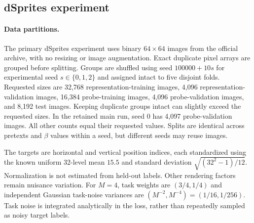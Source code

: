 \begin{table}[t]
  \centering
  
  \caption{\textbf{Fitted theory-to-data quantities.}
    Values concern the five-source-attribute specialist and reconstruction
    generalist. The first four rows are per-task largest eigenvalues.
    $\Delta=0.0181922$ and $D_{\mathrm{miss}}=0.215195$ are fitted proxy
    quantities. The 16.2447-bit threshold is a sufficient isotropic-reference
    bound, not an equality prediction for the empirical crossover.
    The fitted specialist is anisotropic on its span. The saved strict
    isotropy diagnostic also rejects exact full-space isotropy for the
    reconstruction components. Consequently, the reference threshold is
    not asserted as a certificate for these fitted components.
    Crossover intervals condition on a first positive-to-negative crossing.
    All 2,000 resamples cross in each mechanism, with no multiple crossings.}
  \label{tab:app-theory-data}
\end{table}


\subsection{dSprites experiment}
\label{app:dsprites-training-details}
\paragraph{Data partitions.}
The primary dSprites experiment uses binary $64\times64$ images from the
official archive, with no resizing or image augmentation. Exact duplicate
pixel arrays are grouped before splitting. Groups are shuffled using
seed $100000+10s$ for experimental seed $s\in\{0,1,2\}$ and assigned intact
to five disjoint folds. Requested sizes are 32,768 representation-training
images, 4,096 representation-validation images, 16,384 probe-training images,
4,096 probe-validation images, and 8,192 test images. Keeping duplicate groups
intact can slightly exceed the requested sizes. In the retained main run,
seed 0 has 4,097 probe-validation images. All other counts equal their
requested values. Splits are identical across pretexts and $\beta$ values
within a seed, but different seeds may reuse images.

The targets are horizontal and vertical position indices, each standardized
using the known uniform 32-level mean $15.5$ and standard deviation
$\sqrt{(32^2-1)/12}$. Normalization is not estimated from held-out labels.
Other rendering factors remain nuisance variation. For $M=4$, task weights
are $(3/4,1/4)$ and independent Gaussian task-noise variances are
$(M^{-2},M^{-4})=(1/16,1/256)$. Task noise is integrated analytically in the
loss, rather than repeatedly sampled as noisy target labels.

